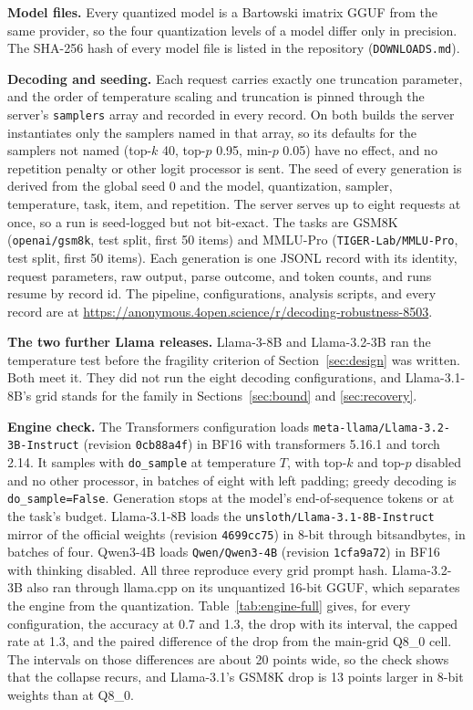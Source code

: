 \documentclass[10pt]{article}
\begin{document}
\textbf{Model files.} Every quantized model is a Bartowski imatrix GGUF from the same provider,
so the four quantization levels of a model differ only in precision. The SHA-256 hash of every
model file is listed in the repository (\texttt{DOWNLOADS.md}).

\textbf{Decoding and seeding.} Each request carries exactly one truncation parameter, and the
order of temperature scaling and truncation is pinned through the server's \texttt{samplers}
array and recorded in every record. On both builds the server instantiates only the samplers
named in that array, so its defaults for the samplers not named (top-$k$ 40, top-$p$ 0.95,
min-$p$ 0.05) have no effect, and no repetition penalty or other logit processor is sent. The
seed of every generation is derived from the global seed 0 and the model, quantization,
sampler, temperature, task, item, and repetition. The server serves up to eight requests at
once, so a run is seed-logged but not bit-exact. The tasks are GSM8K (\texttt{openai/gsm8k},
test split, first 50 items) and MMLU-Pro (\texttt{TIGER-Lab/MMLU-Pro}, test split, first 50
items). Each generation is one JSONL record with its identity, request parameters, raw output,
parse outcome, and token counts, and runs resume by record id. The pipeline, configurations,
analysis scripts, and every record are at
\url{https://anonymous.4open.science/r/decoding-robustness-8503}.

\textbf{The two further Llama releases.} Llama-3-8B and Llama-3.2-3B ran the temperature test
before the fragility criterion of Section~\ref{sec:design} was written. Both meet it. They did
not run the eight decoding configurations, and Llama-3.1-8B's grid stands for the family in
Sections~\ref{sec:bound} and \ref{sec:recovery}.

\textbf{Engine check.} The Transformers \citep{wolf2020transformers} configuration loads
\texttt{meta-llama/Llama-3.2-3B-Instruct} (revision \texttt{0cb88a4f}) in BF16 with
transformers 5.16.1 and torch 2.14. It samples with \texttt{do\_sample} at temperature $T$,
with top-$k$ and top-$p$ disabled and no other processor, in batches of eight with left
padding; greedy decoding is \texttt{do\_sample=False}. Generation stops at the model's
end-of-sequence tokens or at the task's budget. Llama-3.1-8B loads the
\texttt{unsloth/Llama-3.1-8B-Instruct} mirror of the official weights (revision
\texttt{4699cc75}) in 8-bit through bitsandbytes, in batches of four. Qwen3-4B loads
\texttt{Qwen/Qwen3-4B} (revision \texttt{1cfa9a72}) in BF16 with thinking disabled. All three
reproduce every grid prompt hash. Llama-3.2-3B also ran through llama.cpp on its unquantized
16-bit GGUF, which separates the engine from the quantization. Table~\ref{tab:engine-full}
gives, for every configuration, the accuracy at 0.7 and 1.3, the drop with its interval, the
capped rate at 1.3, and the paired difference of the drop from the main-grid Q8\_0 cell. The
intervals on those differences are about 20 points wide, so the check shows that the collapse
recurs, and Llama-3.1's GSM8K drop is 13 points larger in 8-bit weights than at Q8\_0.
\end{document}
